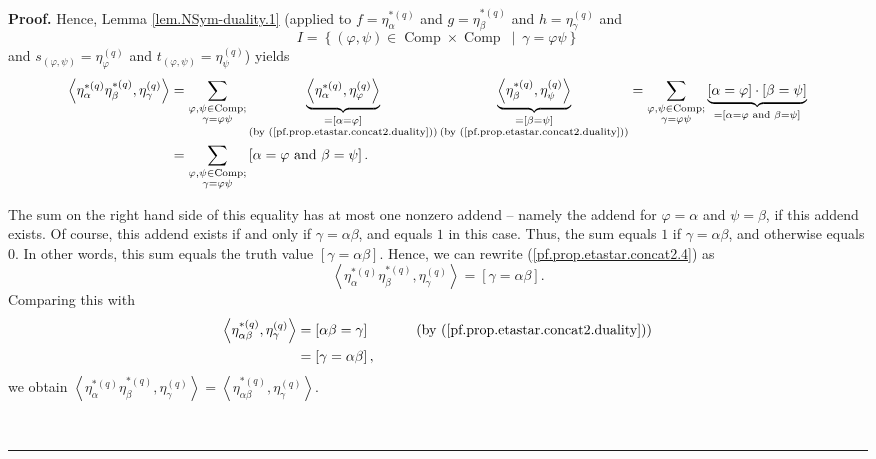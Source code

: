\documentclass[numbers=enddot,12pt,final,onecolumn,notitlepage]{scrartcl}%
\theoremstyle{definition}
\newenvironment{proof}[1][Proof]{\noindent\textbf{#1.} }{\ \rule{0.5em}{0.5em}}
\let\sumnonlimits\sum
\renewcommand{\sum}{\sumnonlimits\limits}
\begin{document}
\begin{proof}
Hence, Lemma \ref{lem.NSym-duality.1} (applied to $f=\eta_{\alpha}%
^{\ast\left(  q\right)  }$ and $g=\eta_{\beta}^{\ast\left(  q\right)  }$ and
$h=\eta_{\gamma}^{\left(  q\right)  }$ and
\[
I=\left\{  \left(  \varphi,\psi\right)  \in\operatorname*{Comp}\times
\operatorname*{Comp}\ \mid\ \gamma=\varphi\psi\right\}
\]
and $s_{\left(  \varphi,\psi\right)  }=\eta_{\varphi}^{\left(  q\right)  }$
and $t_{\left(  \varphi,\psi\right)  }=\eta_{\psi}^{\left(  q\right)  }$)
yields%
\begin{align}
\left\langle \eta_{\alpha}^{\ast\left(  q\right)  }\eta_{\beta}^{\ast\left(
q\right)  },\eta_{\gamma}^{\left(  q\right)  }\right\rangle  &  =\sum
_{\substack{\varphi,\psi\in\operatorname*{Comp};\\\gamma=\varphi\psi
}}\underbrace{\left\langle \eta_{\alpha}^{\ast\left(  q\right)  }%
,\eta_{\varphi}^{\left(  q\right)  }\right\rangle }_{\substack{=\left[
\alpha=\varphi\right]  \\\text{(by (\ref{pf.prop.etastar.concat2.duality}))}%
}}\underbrace{\left\langle \eta_{\beta}^{\ast\left(  q\right)  },\eta_{\psi
}^{\left(  q\right)  }\right\rangle }_{\substack{=\left[  \beta=\psi\right]
\\\text{(by (\ref{pf.prop.etastar.concat2.duality}))}}}=\sum
_{\substack{\varphi,\psi\in\operatorname*{Comp};\\\gamma=\varphi\psi
}}\underbrace{\left[  \alpha=\varphi\right]  \cdot\left[  \beta=\psi\right]
}_{=\left[  \alpha=\varphi\text{ and }\beta=\psi\right]  }\nonumber\\
&  =\sum_{\substack{\varphi,\psi\in\operatorname*{Comp};\\\gamma=\varphi\psi
}}\left[  \alpha=\varphi\text{ and }\beta=\psi\right]  .
\label{pf.prop.etastar.concat2.4}%
\end{align}


The sum on the right hand side of this equality has at most one nonzero addend
-- namely the addend for $\varphi=\alpha$ and $\psi=\beta$, if this addend
exists. Of course, this addend exists if and only if $\gamma=\alpha\beta$, and
equals $1$ in this case. Thus, the sum equals $1$ if $\gamma=\alpha\beta$, and
otherwise equals $0$. In other words, this sum equals the truth value $\left[
\gamma=\alpha\beta\right]  $. Hence, we can rewrite
(\ref{pf.prop.etastar.concat2.4}) as%
\[
\left\langle \eta_{\alpha}^{\ast\left(  q\right)  }\eta_{\beta}^{\ast\left(
q\right)  },\eta_{\gamma}^{\left(  q\right)  }\right\rangle =\left[
\gamma=\alpha\beta\right]  .
\]
Comparing this with%
\begin{align*}
\left\langle \eta_{\alpha\beta}^{\ast\left(  q\right)  },\eta_{\gamma
}^{\left(  q\right)  }\right\rangle  &  =\left[  \alpha\beta=\gamma\right]
\ \ \ \ \ \ \ \ \ \ \left(  \text{by (\ref{pf.prop.etastar.concat2.duality}%
)}\right) \\
&  =\left[  \gamma=\alpha\beta\right]  ,
\end{align*}
we obtain $\left\langle \eta_{\alpha}^{\ast\left(  q\right)  }\eta_{\beta
}^{\ast\left(  q\right)  },\eta_{\gamma}^{\left(  q\right)  }\right\rangle
=\left\langle \eta_{\alpha\beta}^{\ast\left(  q\right)  },\eta_{\gamma
}^{\left(  q\right)  }\right\rangle $.


\end{proof}
\end{document}

